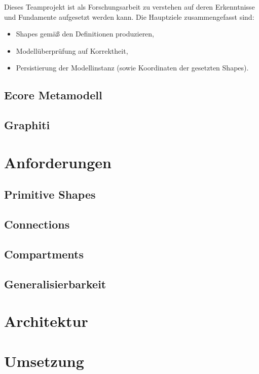 Dieses Teamprojekt ist als Forschungsarbeit zu verstehen
auf deren Erkenntnisse und Fundamente aufgesetzt werden kann.
Die Hauptziele zusammengefasst sind:

\begin{itemize}
  \item Shapes gemäß den Definitionen produzieren,
  \item Modellüberprüfung auf Korrektheit,
  \item Persistierung der Modellinstanz (sowie Koordinaten der gesetzten Shapes).
\end{itemize}


\subsection{Ecore Metamodell}\label{sec.ecore}

\subsection{Graphiti}


\section{Anforderungen}

\subsection{Primitive Shapes}

\subsection{Connections}

\subsection{Compartments}

\subsection{Generalisierbarkeit}


\section{Architektur}


\section{Umsetzung}


